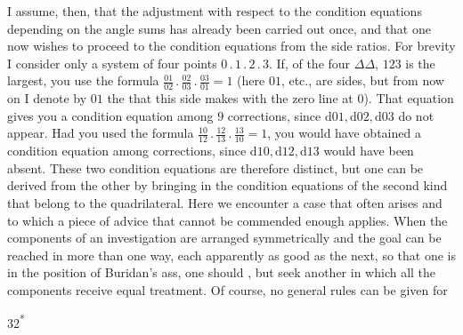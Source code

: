 I assume, then, that the adjustment with respect to the condition equations depending on the angle sums has already been carried out once, and that one now wishes to proceed to the condition equations from the side ratios. For brevity I consider only a system of four points \(0\,.\,1\,.\,2\,.\,3\). If, of the four \(\Delta\Delta\), \(123\) is the largest, you use the formula \(\frac{01}{02}\,.\,\frac{02}{03}\,.\,\frac{03}{01}=1\) (here \(01\), etc., are sides, but from now on I denote by \(01\) the  that this side makes with the zero line at \(0\)). That equation gives you  a condition equation among \(9\) corrections, since \(\mathrm{d}01,\mathrm{d}02,\mathrm{d}03\) do not appear. Had you used the formula \(\frac{10}{12}\,.\,\frac{12}{13}\,.\,\frac{13}{10}=1\), you would have obtained a condition equation among  corrections, since \(\mathrm{d}10,\mathrm{d}12,\mathrm{d}13\) would have been absent. These two condition equations are therefore distinct, but one can be derived from the other by bringing in the condition equations of the second kind that belong to the quadrilateral. Here we encounter a case that often arises and to which a piece of advice that cannot be commended enough applies. When the components of an investigation are arranged symmetrically and the goal can be reached in more than one way, each apparently as good as the next, so that one is in the position of Buridan's ass, one should , but seek another in which all the components receive equal treatment. Of course, no general rules can be given for
\par\smallskip
\noindent\hfill{\small 32\textsuperscript{*}}\hspace*{.12\linewidth}\par
